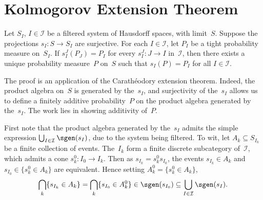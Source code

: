 \chapter	{Kolmogorov Extension Theorem}

\begin	{theorem}	
Let $S_I$, \( I \in \mathcal I \) be a filtered system of Hausdorff spaces,
with limit~$S$.
Suppose the projections \( s_I \colon S \to S_I \) are surjective.
For each \( I \in \mathcal I \), let $P_I$ be a tight probability measure
on~$S_I$.
If \( s_I^J(P_J) = P_I \) for every \( s_I^J \colon J \to I \) in~$\mathcal I$,
then there exists a unique probability measure~$P$ on~$S$ such that
\( s_I(P) = P_I \) for all \( I \in \mathcal I \).
\end	{theorem}
The proof is an application of the Carathéodory extension theorem.
Indeed, the product \sig algebra on~$S$ is generated by the~$s_I$,
and surjectivity of the~$s_I$ allows us to define a finitely additive
probability~$P$ on the product algebra generated by the~$s_I$.
The work lies in showing \sig additivity of~$P$.

First note that the product algebra generated by the~$s_I$
admits the simple expression
\( \bigcup_{I \in \mathcal I} \sgen(s_I) \),
due to the system being filtered.
To wit, let \( A_k \subseteq S_{I_k} \) be a finite collection of events.
The~$I_k$ form a finite discrete subcategory of~$\mathcal I$,
which admits a cone \( s_k^0 \colon I_0 \to I_k \).
Then as \( s_{I_k} = s_k^0 s_{I_0} \),
the events \( s_{I_k} \in A_k \) and \( s_{I_0} \in \{s_k^0 \in A_k\} \)
are equivalent.
Hence setting \( A_k^0 = \{s_k^0 \in A_k\} \),
\begin	{equation}
\label	{eq:product-algebra-union}
	\bigcap_k \{s_{I_k} \in A_k\} = \bigcap_k \{s_{I_0} \in A_k^0\}
		\in \sgen(s_{I_0})
		\subseteq \bigcup_{I \in \mathcal I} \sgen(s_I)
	\text.
\end	{equation}
